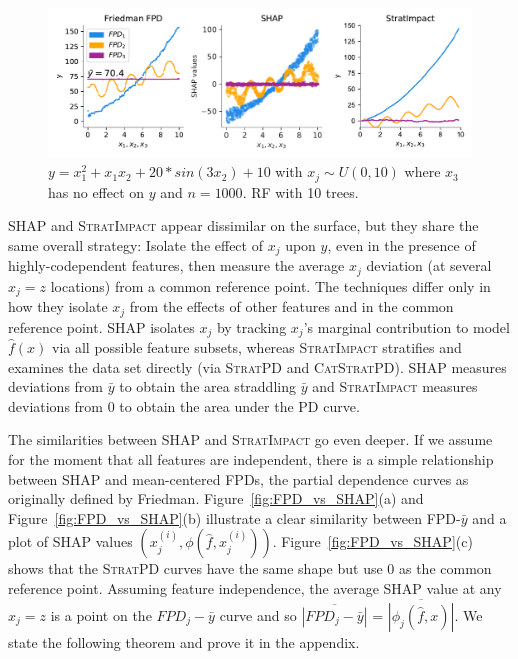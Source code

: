 \documentclass[11pt]{article}
\newcommand{\figref}[1]{Figure~\ref{#1}}
\newcommand{\simp}{\fontfamily{cmr}\textsc{\small StratImpact}}
\newcommand{\spd}{\fontfamily{cmr}\textsc{\small StratPD}}
\newcommand{\cspd}{\fontfamily{cmr}\textsc{\small CatStratPD}}
\begin{document}
\begin{figure}[htbp]
\begin{center}
\includegraphics[scale=0.6]{images/FPD-SHAP-PD.pdf}\vspace{-5mm}
\caption{\small $y = x_1^2 + x_1 x_2 + 20*sin(3 x_2) + 10$ with $x_j \sim U(0,10)$ where $x_3$ has no effect on $y$ and $n=1000$. RF with 10 trees.}
\label{fig:shap-weight}
\end{center}
\end{figure}

SHAP and \simp{} appear dissimilar on the surface, but they share the same overall strategy: Isolate the effect of $x_j$ upon $y$, even in the presence of highly-codependent features, then measure the average $x_j$ deviation (at several $x_j=z$ locations) from a common reference point. The techniques differ only in how they isolate $x_j$ from the effects of other features and in the common reference point. SHAP isolates $x_j$ by tracking $x_j$'s marginal contribution to model $\hat{f}(x)$ via all possible feature subsets, whereas \simp{} stratifies and examines the data set directly (via \spd{} and \cspd). SHAP measures deviations from $\bar{y}$ to obtain the area straddling $\bar{y}$ and \simp{} measures deviations from 0 to obtain the area under the PD curve.

The similarities between SHAP and \simp{} go even deeper.  If we assume for the moment that all features are independent, there is a simple relationship between SHAP and mean-centered FPDs, the partial dependence curves as originally defined by Friedman.  \figref{fig:FPD_vs_SHAP}(a) and \figref{fig:FPD_vs_SHAP}(b) illustrate a clear similarity between FPD-$\bar{y}$ and a plot of SHAP values $(x_j^{(i)}, \phi(\hat{f},x_j^{(i)}))$. \figref{fig:FPD_vs_SHAP}(c) shows that the \spd{} curves have the same shape but use 0 as the common reference point.   Assuming feature independence, the average SHAP value at any $x_j = z$ is a point on the $FPD_j - \bar{y}$ curve and so $\overline{|FPD_j-\bar{y}|}$ = $\overline{|\phi_j(\hat{f},x)|}$.  We state the following theorem and prove it in the appendix.
\end{document}
